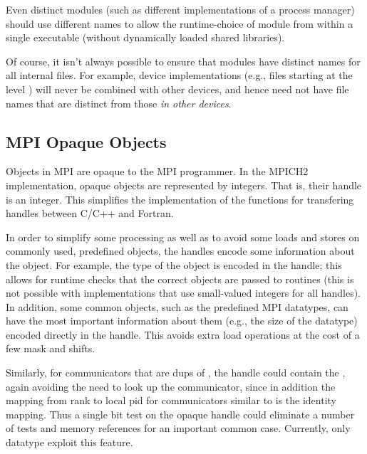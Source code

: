 \documentclass{article}
\begin{document}
Even distinct modules (such as different implementations of a process
manager) should use different names to allow the runtime-choice of
module from within a single executable (without dynamically loaded
shared libraries).

Of course, it isn't always possible to ensure that modules have
distinct names for all internal files.  For example, device
implementations (e.g., files starting at the level
) will never be combined with other
devices, and hence need not have file names that are distinct from
those \emph{in other devices}.  

\subsection{MPI Opaque Objects}
\label{sec:mpi-opaque}
Objects in MPI are opaque to the MPI programmer.  
In the MPICH2 implementation, opaque 
objects are represented 
by integers.  That is, their handle is an integer.
This simplifies the implementation of the functions for
transfering handles between C/C++ and Fortran.  

In order to simplify some processing as well as to avoid some loads
and stores on commonly used, predefined objects, the handles encode
some information about the object.  For example, the type of the
object is encoded in the handle; this allows for runtime checks that
the correct objects are passed to routines (this is not possible with
implementations that use small-valued integers for all handles).  In
addition, some common objects, such as the predefined MPI datatypes,
can have the most important information about them (e.g., the size of
the datatype) encoded directly in the handle.  This avoids extra load
operations at the cost of a few mask and shifts. 

Similarly, for
communicators that are dups of , the handle could
contain the , again avoiding the need to look up the
communicator, since in addition the mapping from rank to local pid for 
communicators similar to  is the identity
mapping.  Thus a single bit test on the opaque handle could eliminate
a number of tests and memory references for an important common case.
Currently, only datatype exploit this feature.
\end{document}
